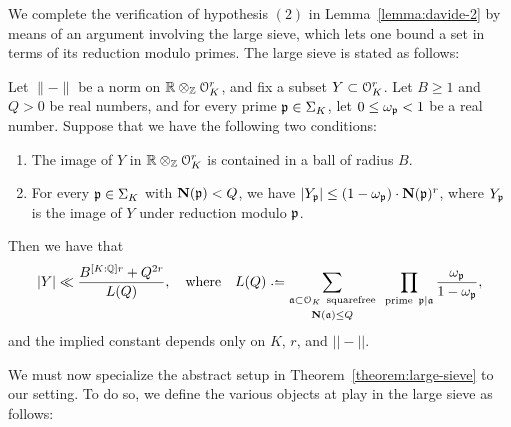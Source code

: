 We complete the verification of hypothesis $(2)$ in Lemma~\ref{lemma:davide-2} by means of an argument involving the large sieve, which lets one bound a set in terms of its reduction modulo primes. The large sieve is stated as follows:
\begin{theorem} \label{theorem:large-sieve}
Let $\lVert - \rVert$ be a norm on ${\mathbb R} \otimes_{{\mathbb Z}} \mathcal{O}_{K}^r$, and fix a subset $Y \subset \mathcal{O}_K^r$. Let $B \ge 1$ and $Q > 0$ be real numbers, and for every prime ${\mathfrak{p}} \in \Sigma_K$, let $0 \le \omega_{\mathfrak{p}} < 1$ be a real number. Suppose that we have the following two conditions:
	\begin{enumerate}
		\item The image of $Y$ in ${\mathbb R} \otimes_{{\mathbb Z}} \mathcal{O}_{K}^r$ is contained in a ball of radius $B$.
		\item For every ${\mathfrak{p}} \in \Sigma_K$ with $\mathbf{N} (\mathfrak{p}) < Q$, we have
		$
			|Y_{\mathfrak{p}}| \le (1 - \omega_{\mathfrak{p}})\cdot \mathbf{N} (\mathfrak{p})^r
		$,
		where $Y_{\mathfrak{p}}$ is the image of $Y$ under reduction modulo $\mathfrak{p}$.
	\end{enumerate}
	Then we have that
	\[
		|Y| \ll \frac{B^{[K:\bq]r} + Q^{2r}}{L(Q)}, \quad \text{where} \quad L(Q) \defeq \sum_{\substack{\mf{a} \subset \mc{O}_K\,\,\, \mathrm{ squarefree} \\[0.1cm] \N (\mf{a}) \le Q}}\,\,\, \prod_{\mathrm{prime}\,\,\,\mf{p} | \mf{a}} \frac{\omega_{\mf{p}}}{1 - \omega_{\mf{p}}},
	\]
    and the implied constant depends only on $K$, $r$, and $||-||$.
\end{theorem}
We must now specialize the abstract setup in Theorem~\ref{theorem:large-sieve} to our setting. To do so, we define the various objects at play in the large sieve as follows:
